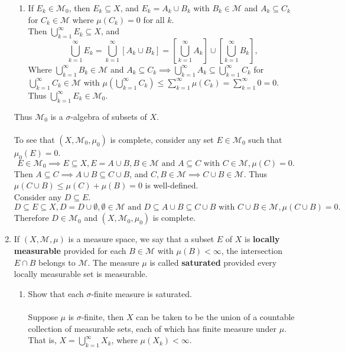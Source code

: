 \begin{enumerate}
\begin{enumerate}[label=(\roman*),align=left]
		\item If $E_k\in\mathcal{M}_0$, then $E_k\subseteq X$, and $E_k=A_k\cup B_k$ with $B_k\in\mathcal{M}$ and $A_k\subseteq C_k$ for $C_k\in\mathcal{M}$ where $\mu(C_k)=0$ for all $k$.\\
		Then $\bigcup_{k=1}^\infty E_k\subseteq X$, and 
		\[
			\bigcup_{k=1}^\infty E_k=\bigcup_{k=1}^\infty [A_k\cup B_k]=[\bigcup_{k=1}^\infty A_k]\cup[\bigcup_{k=1}^\infty B_k],
		\]
		Where $\bigcup_{k=1}^\infty B_k\in\mathcal{M}$ and $A_k\subseteq C_k\implies\bigcup_{k=1}^\infty A_k\subseteq \bigcup_{k=1}^\infty C_k$ for $\bigcup_{k=1}^\infty C_k\in\mathcal{M}$ with $\mu(\bigcup_{k=1}^\infty C_k)\le\sum_{k=1}^\infty\mu(C_k)=\sum_{k=1}^\infty0=0$.
		\\Thus $\bigcup_{k=1}^\infty E_k\in\mathcal{M}_0$.
	\end{enumerate}
	Thus $\mathcal{M}_0$ is a $\sigma$-algebra of subsets of $X$.\\
	\\To see that $(X,\mathcal{M}_0,\mu_0)$ is complete, consider any set $E\in\mathcal{M}_0$ such that $\mu_0(E)=0$.
	\[
		E\in\mathcal{M}_0\implies E\subseteq X,E=A\cup B, B\in\mathcal{M}\text{ and }A\subseteq C\text{ with }C\in\mathcal{M}, \mu(C)=0.
	\]
	Then $A\subseteq C\implies A\cup B\subseteq C\cup B$, and $C,B\in\mathcal{M}\implies C\cup B\in\mathcal{M}$.
	Thus $\mu(C\cup B)\le \mu(C)+\mu(B)=0$ is well-defined.
	\\Consider any $D\subseteq E$.
	\[
		D\subseteq E\subseteq X,D=D\cup \emptyset, \emptyset\in\mathcal{M}\text{ and }D\subseteq A\cup B\subseteq C\cup B\text{ with }C\cup B\in\mathcal{M}, \mu(C\cup B)=0.
	\]
	Therefore $D\in \mathcal{M}_0$ and $(X,\mathcal{M}_0,\mu_0)$ is complete.
	\item If $(X,\mathcal{M},\mu)$ is a measure space, we say that a subset $E$ of $X$ is \textbf{locally measurable} provided for each $B\in\mathcal{M}$ with $\mu(B)<\infty$, the intersection $E\cap B$ belongs to $\mathcal{M}$.
	The measure $\mu$ is called \textbf{saturated} provided every locally measurable set is measurable.
	\begin{enumerate}[label=(\roman*),align=left]  
		\item Show that each $\sigma$-finite measure is saturated.\\
		\\Suppose $\mu$ is $\sigma$-finite, then $X$ can be taken to be the union of a countable collection of measurable sets, each of which has finite measure under $\mu$.
		\\That is, $X=\bigcup_{k=1}^\infty X_k$, where $\mu(X_k)<\infty$.

\end{enumerate}
\end{enumerate}
